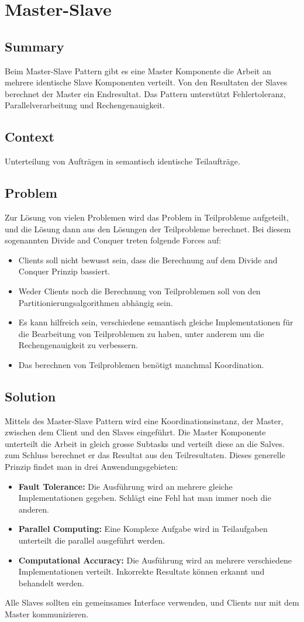 \chapter{Master-Slave}

\section{Summary}
Beim Master-Slave Pattern gibt es eine Master Komponente die Arbeit an mehrere identische Slave Komponenten verteilt. Von den Resultaten der Slaves berechnet der Master ein Endresultat. Das Pattern unterstützt Fehlertoleranz, Parallelverarbeitung und Rechengenauigkeit.
\section{Context}
Unterteilung von Aufträgen in semantisch identische Teilaufträge.
\section{Problem}
Zur Lösung von vielen Problemen wird das Problem in Teilprobleme aufgeteilt, und die Lösung dann aus den Lösungen der Teilprobleme berechnet. Bei diesem sogenannten \glqq Divide and Conquer\grqq{} treten folgende Forces auf:
\begin{itemize}
	\item Clients soll nicht bewusst sein, dass die Berechnung auf dem \glqq Divide and Conquer\grqq{} Prinzip bassiert.
	\item Weder Clients noch die Berechnung von Teilproblemen soll von den Partitionierungsalgorithmen abhängig sein.
	\item Es kann hilfreich sein, verschiedene semantisch gleiche Implementationen für die Bearbeitung von Teilproblemen zu haben, unter anderem um die Rechengenauigkeit zu verbessern.
	\item Das berechnen von Teilproblemen benötigt manchmal Koordination.
\end{itemize}
\section{Solution}
Mittels des Master-Slave Pattern wird eine Koordinationsinstanz, der Master, zwischen dem Client und den Slaves eingeführt. Die Master Komponente unterteilt die Arbeit in gleich grosse Subtasks und verteilt diese an die Salves. zum Schluss berechnet er das Resultat aus den Teilresultaten. Dieses generelle Prinzip findet man in drei Anwendungsgebieten:
\begin{itemize}
	\item \textbf{Fault Tolerance:} Die Ausführung wird an mehrere gleiche Implementationen gegeben. Schlägt eine Fehl hat man immer noch die anderen.
	\item \textbf{Parallel Computing:} Eine Komplexe Aufgabe wird in Teilaufgaben unterteilt die parallel ausgeführt werden.
	\item \textbf{Computational Accuracy:} Die Ausführung wird an mehrere verschiedene Implementationen verteilt. Inkorrekte Resultate können erkannt und behandelt werden.
\end{itemize}
Alle Slaves sollten ein gemeinsames Interface verwenden, und Clients nur mit dem Master kommunizieren.
